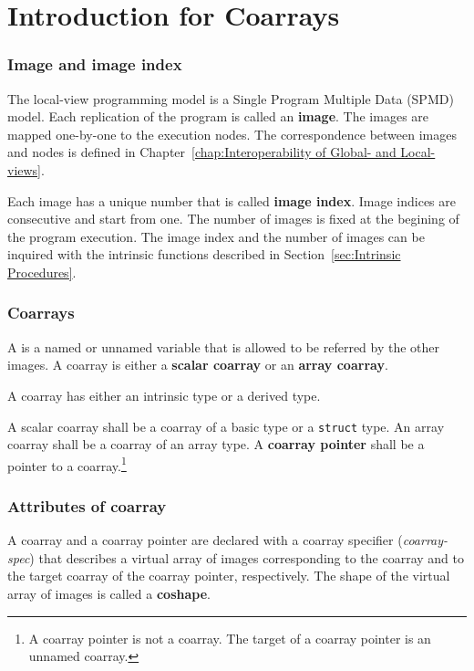 \section{Introduction for Coarrays}
\label{sec:Introduction for Coarrays}

\subsubsection*{Image and image index}
The local-view programming model is a Single Program Multiple Data (SPMD) model.
Each replication of the program is called an {\bf image}.
The images are mapped one-by-one to the execution nodes.
The correspondence between images and nodes is defined in 
Chapter~\ref{chap:Interoperability of Global- and Local-views}.

Each image has a unique number that is called {\bf image index}. 
Image indices are consecutive and start from one.
The number of images is fixed at the begining of the program execution.
The image index and the number of images can be inquired with the intrinsic
functions described in Section~\ref{sec:Intrinsic Procedures}.

\subsubsection*{Coarrays}
A  is a named or unnamed variable that is allowed to be referred 
by the other images. 
A coarray is either a {\bf scalar coarray} or an {\bf array coarray}.

{\onlyF}
A coarray has either an intrinsic type or a derived type.

{\onlyC}
A scalar coarray shall be a coarray of a basic type or a {\tt struct} type.
An array coarray shall be a coarray of an array type.
A {\bf coarray pointer} shall be a pointer to a coarray.\footnote
{A coarray pointer is not a coarray. 
The target of a coarray pointer is an unnamed coarray.}

\subsubsection*{Attributes of coarray}
A coarray and a coarray pointer are declared with a coarray specifier ({\it coarray-spec}) 
that describes a virtual array of images
corresponding to the coarray and to the target coarray of the coarray pointer,
respectively.
The shape of the virtual array of images is called a {\bf coshape}.

